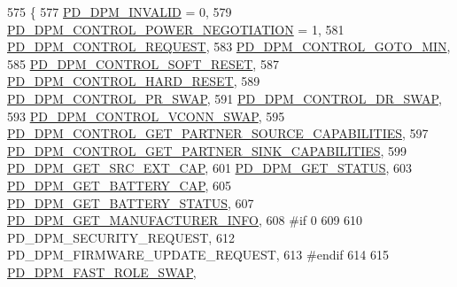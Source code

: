 \begin{DoxyCode}
575 \{
577     \hyperlink{group__usb__pd__stack_ggabf2676c3360b7c572954ae09c0a5e46aaddf81928b92d0508a972025037cae4c5}{PD\_DPM\_INVALID} = 0,
579     \hyperlink{group__usb__pd__stack_ggabf2676c3360b7c572954ae09c0a5e46aa30530dc299e85a527d236c16e68bff36}{PD\_DPM\_CONTROL\_POWER\_NEGOTIATION} = 1,
581     \hyperlink{group__usb__pd__stack_ggabf2676c3360b7c572954ae09c0a5e46aaba6e4b2d7dedd71db8266ca2c496af71}{PD\_DPM\_CONTROL\_REQUEST},
583     \hyperlink{group__usb__pd__stack_ggabf2676c3360b7c572954ae09c0a5e46aa489f1c5b0996d8e8c13ba13bc89da9f8}{PD\_DPM\_CONTROL\_GOTO\_MIN},
585     \hyperlink{group__usb__pd__stack_ggabf2676c3360b7c572954ae09c0a5e46aa047c61de46f8d33e6944b8c6971ae5f6}{PD\_DPM\_CONTROL\_SOFT\_RESET},
587     \hyperlink{group__usb__pd__stack_ggabf2676c3360b7c572954ae09c0a5e46aabd4e605546d67fb4bbfad35ea77f5589}{PD\_DPM\_CONTROL\_HARD\_RESET},
589     \hyperlink{group__usb__pd__stack_ggabf2676c3360b7c572954ae09c0a5e46aa5bf96cb3d2c1316e33303794e70be8a4}{PD\_DPM\_CONTROL\_PR\_SWAP},
591     \hyperlink{group__usb__pd__stack_ggabf2676c3360b7c572954ae09c0a5e46aa7baf188a71537ab45cc32ff871765ef0}{PD\_DPM\_CONTROL\_DR\_SWAP},
593     \hyperlink{group__usb__pd__stack_ggabf2676c3360b7c572954ae09c0a5e46aa9be0b6c27f6eb87d6466b9697915f460}{PD\_DPM\_CONTROL\_VCONN\_SWAP},
595     \hyperlink{group__usb__pd__stack_ggabf2676c3360b7c572954ae09c0a5e46aae21522a20dc98bf1e6a27fd41104158a}{PD\_DPM\_CONTROL\_GET\_PARTNER\_SOURCE\_CAPABILITIES},
597     \hyperlink{group__usb__pd__stack_ggabf2676c3360b7c572954ae09c0a5e46aa4ea4864194875bf84ea3b2cf923a6f14}{PD\_DPM\_CONTROL\_GET\_PARTNER\_SINK\_CAPABILITIES},
599     \hyperlink{group__usb__pd__stack_ggabf2676c3360b7c572954ae09c0a5e46aa878ef19e6ac385bd02876ceb23629865}{PD\_DPM\_GET\_SRC\_EXT\_CAP},
601     \hyperlink{group__usb__pd__stack_ggabf2676c3360b7c572954ae09c0a5e46aad86c8e205d8307f0e9891f594f801fd3}{PD\_DPM\_GET\_STATUS},
603     \hyperlink{group__usb__pd__stack_ggabf2676c3360b7c572954ae09c0a5e46aac2fe93d0e29fa39cef8bd57f45ee5a05}{PD\_DPM\_GET\_BATTERY\_CAP},
605     \hyperlink{group__usb__pd__stack_ggabf2676c3360b7c572954ae09c0a5e46aaf908c79595be0dd645a1edd222cfa471}{PD\_DPM\_GET\_BATTERY\_STATUS},
607     \hyperlink{group__usb__pd__stack_ggabf2676c3360b7c572954ae09c0a5e46aa59afaaae85a74936ea0cc5f66b9fb4ae}{PD\_DPM\_GET\_MANUFACTURER\_INFO},
608 \textcolor{preprocessor}{#if 0
}
609 \textcolor{preprocessor}{}
610     PD\_DPM\_SECURITY\_REQUEST,
612     PD\_DPM\_FIRMWARE\_UPDATE\_REQUEST,
613 \textcolor{preprocessor}{#endif
}
614 \textcolor{preprocessor}{}
615     \hyperlink{group__usb__pd__stack_ggabf2676c3360b7c572954ae09c0a5e46aa1af15d89c350437f5f4e8a95ea841f5b}{PD\_DPM\_FAST\_ROLE\_SWAP},

\end{DoxyCode}
